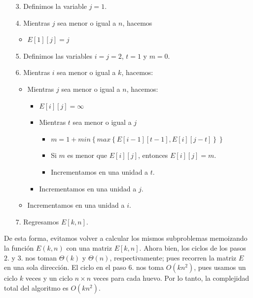 \documentclass[letterpaper,11pt]{article}
\begin{document}
\begin{enumerate}
\begin{itemize}
        \item[3.] Definimos la variable $j = 1$.
        
        \item[4.] Mientras $j$ sea menor o igual a $n$, hacemos 
        \begin{itemize}
            \item $E[1][j] = j$
        \end{itemize}

        \item[5.] Definimos las variables $i = j = 2$, $t = 1$ y $m = 0$.

        \item[6.] Mientras $i$ sea menor o igual a $k$, hacemos:
        \begin{itemize}
            \item Mientras $j$ sea menor o igual a $n$, hacemos:
            \begin{itemize}
                \item $E[i][j] = \infty$

                \item Mientras $t$ sea menor o igual a $j$
                \begin{itemize}
                    \item 
                    $m = 1 + 
                    min\left\{max\left\{E[i-1][t-1], E[i][j-t]\right\}\right\}$

                    \item Si $m$ es menor que $E[i][j]$, entonces $E[i][j] = m$.

                    \item Incrementamos en una unidad a $t$.
                \end{itemize}

                \item Incrementamos en una unidad a $j$.
            \end{itemize}

            \item Incrementamos en una unidad a $i$.
        \end{itemize}

        \item[7.] Regresamos $E[k,n]$.
    \end{itemize}

    De esta forma, evitamos volver a calcular los mismos subproblemas 
    memoizando la función $E(k,n)$ con una matriz $E[k,n]$. Ahora bien, los 
    ciclos de los pasos $2.$ y $3.$ nos toman $\Theta(k)$ y $\Theta(n)$, 
    respectivamente; pues recorren la matriz $E$ en una sola dirección. El 
    ciclo en el paso $6.$ nos toma $O(kn^2)$, pues usamos un ciclo $k$ veces 
    y un ciclo $n \times n$ veces para cada huevo. Por lo tanto, la 
    complejidad total del algoritmo es $O(kn^2)$.


\end{enumerate}
\end{document}
